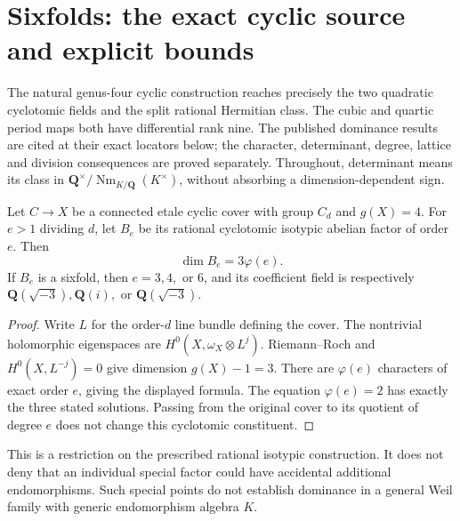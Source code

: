 \section{Sixfolds: the exact cyclic source and explicit bounds}
\label{sec:sixfolds}

The natural genus-four cyclic construction reaches precisely the two
quadratic cyclotomic fields and the split rational Hermitian class.
The cubic and quartic period maps both have differential rank nine.
The published dominance results are cited at their exact locators below;
the character, determinant, degree, lattice and division consequences are
proved separately. Throughout, determinant means its class in
$\mathbf Q^\times/\operatorname{Nm}_{K/\mathbf Q}(K^\times)$,
without absorbing a dimension-dependent sign.

\begin{proposition}
\label{SF-01}
Let $C\to X$ be a connected etale cyclic cover with group $C_d$ and
$g(X)=4$. For $e>1$ dividing $d$, let $B_e$ be its rational cyclotomic
isotypic abelian factor of order $e$. Then
\[
 \dim B_e=3\varphi(e).
\]
If $B_e$ is a sixfold, then $e=3,4,$ or $6$, and its coefficient
field is respectively $\mathbf Q(\sqrt{-3}),\mathbf Q(i),$ or
$\mathbf Q(\sqrt{-3})$.
\end{proposition}
\begin{proof}
Write $L$ for the order-$d$ line bundle defining the cover. The nontrivial
holomorphic eigenspaces are $H^0(X,\omega_X\otimes L^j)$. Riemann--Roch
and $H^0(X,L^{-j})=0$ give dimension $g(X)-1=3$. There are
$\varphi(e)$ characters of exact order $e$, giving the displayed
formula. The equation $\varphi(e)=2$ has exactly the three stated
solutions. Passing from the original cover to its quotient of degree
$e$ does not change this cyclotomic constituent.
\end{proof}
This is a restriction on the prescribed rational isotypic construction.
It does not deny that an individual special factor could have accidental
additional endomorphisms. Such special points do not establish dominance
in a general Weil family with generic endomorphism algebra $K$.

